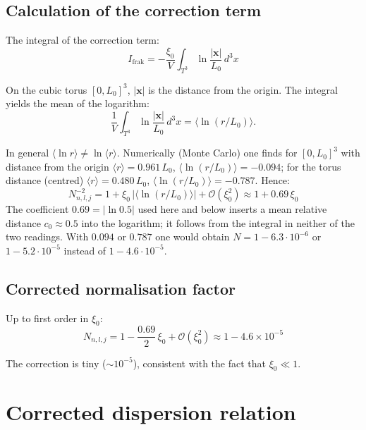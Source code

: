 \subsection{Calculation of the correction term}

The integral of the correction term:
\begin{equation}
  I_{\text{frak}} = -\frac{\xi_0}{V}
  \int_{T^3}\ln\frac{|\mathbf{x}|}{L_0}\,d^3x
  \label{eq:I-frak}
\end{equation}

On the cubic torus $[0,L_0]^3$, $|\mathbf{x}|$ is
the distance from the origin. The integral yields the mean of the
logarithm:
\begin{equation}
  \frac{1}{V}\int_{T^3}\ln\frac{|\mathbf{x}|}{L_0}\,d^3x
  = \langle\ln(r/L_0)\rangle .
\end{equation}

In general $\langle\ln r\rangle \neq \ln\langle r\rangle$.
Numerically (Monte Carlo) one finds for $[0,L_0]^3$ with distance from
the origin $\langle r\rangle = 0.961\,L_0$,
$\langle\ln(r/L_0)\rangle = -0.094$; for the torus distance (centred)
$\langle r\rangle = 0.480\,L_0$, $\langle\ln(r/L_0)\rangle = -0.787$.
Hence:
\begin{equation}
  N_{n,l,j}^{-2} = 1 + \xi_0\,|\langle\ln(r/L_0)\rangle| + \mathcal{O}(\xi_0^2)
  \approx 1 + 0.69\,\xi_0
  \label{eq:N-quadrat}
\end{equation}
The coefficient $0.69 = |\ln 0.5|$ used here and below inserts a mean
relative distance $c_0 \approx 0.5$ into the logarithm; it follows from
the integral in neither of the two readings. With $0.094$ or $0.787$
one would obtain $N = 1 - 6.3 \cdot 10^{-6}$ or $1 - 5.2 \cdot 10^{-5}$
instead of $1 - 4.6 \cdot 10^{-5}$.

\subsection{Corrected normalisation factor}

Up to first order in $\xi_0$:
\begin{equation}
  N_{n,l,j} = 1 - \frac{0.69}{2}\,\xi_0 + \mathcal{O}(\xi_0^2)
  \approx 1 - 4.6 \times 10^{-5}
  \label{eq:N-wert}
\end{equation}

The correction is tiny ($\sim 10^{-5}$), consistent with
the fact that $\xi_0 \ll 1$.

\section{Corrected dispersion relation}

